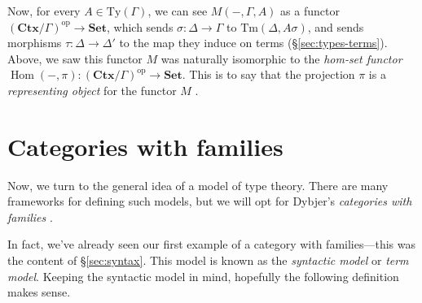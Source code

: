 \documentclass{article}
\theoremstyle{definition}
\newcommand{\C}{\mathbf{Ctx}}
\newcommand{\Set}{\mathbf{Set}}
\newcommand{\Ty}{\mathrm{Ty}}
\newcommand{\Tm}{\mathrm{Tm}}
\newcommand{\op}[1]{{#1}^\mathrm{op}}           %
\DeclareMathOperator{\Hom}{Hom}
\begin{document}
Now, for every $A \in \Ty(\Gamma)$, we can see $M(-,\Gamma,A)$ as a functor $\op{(\C/\Gamma)} \to \Set$, which sends $\sigma\colon \Delta \to \Gamma$ to $\Tm(\Delta,A\sigma)$, and sends morphisms $\tau\colon \Delta \to \Delta'$ to the map they induce on terms (\S\ref{sec:types-terms}). Above, we saw this functor $M$ was naturally isomorphic to the \textit{hom-set functor} $\Hom(-,\pi)\colon \op{(\C/\Gamma)} \to \Set$. This is to say that the projection $\pi$ is a \textit{representing object} for the functor $M$ \cite{nlab-cwfs}.


\section{Categories with families}

Now, we turn to the general idea of a model of type theory. There are many frameworks for defining such models, but we will opt for Dybjer's \textit{categories with families} \cite{peter}.

In fact, we've already seen our first example of a category with families---this was the content of \S\ref{sec:syntax}. This model is known as the \textit{syntactic model} or \textit{term model}. Keeping the syntactic model in mind, hopefully the following definition makes sense.
\end{document}
